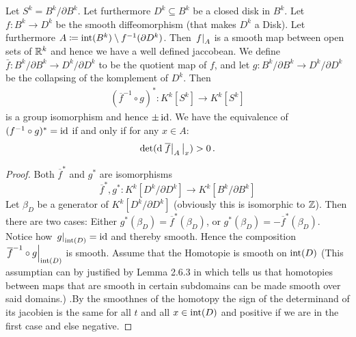 \begin{lemma} \label{lem: determined of javobean and collapsing map}
	Let $S^k=B^k\big/\partial B^k$. Let furthermore $D^k\subseteq B^k$ be a closed disk in $B^k$. Let $f: B^k\to D^k$ be the smooth diffeomorphism (that makes $D^k$ a Disk). Let furthermore $A\coloneq \operatorname{\mathrm{int}}(B^k)\setminus f^{-1}(\partial D^k)$. Then $\left.f\right|_{A}$ is a smooth map between open sets of $\mathbb{R}^k$ and hence we have a well defined jaccobean. We define $\bar{f}:B^k\big/\partial B^k\to D^k\big/ \partial D^k$ to be the quotient map of $f$, and let $g:B^k\big/\partial B^k\to D^k\big/ \partial D^k$ be the collapsing of the komplement of $D^k$. Then 
	\begin{align*}
		(\overline{f}^{-1}\circ g)^*: K^k[S^k]\to K^k[S^k]
	\end{align*} is a group isomorphism and hence $\pm \operatorname{\mathrm{id}}$. We have the equivalence of $(f^{-1}\circ g)^*=\operatorname{\mathrm{id}}$ if and only if for any $x\in A$:
	\begin{equation*}
		\det(\mathop{}\!\mathrm{d} \left.\overline{f}\right|_{A}\big|_x)>0\, .
	\end{equation*}
\end{lemma}
\begin{proof} Both $\overline{f}^*$ and $g^*$ are isomorphisms
	\begin{equation*}
		\overline{f}^*,g^*:K^k[D^k\big/\partial D^k]\to K^k[B^k\big/\partial B^k]
	\end{equation*} Let $\beta_D$ be a generator of $K^k[D^k\big/\partial D^k]$ (obviously this is isomorphic to $\mathbb{Z}$). Then there are two cases: Either $g^*(\beta_D)=\overline{f}^*(\beta_D)$, or $g^*(\beta_D)=-\overline{f}^*(\beta_D)$. 
	Notice how $\left.g\right|_{\operatorname{\mathrm{int}}(D)}=\operatorname{\mathrm{id}}$ and thereby smooth. Hence the composition $\left.\overline{f}^{-1}\circ g\right|_{\operatorname{\mathrm{int}}(D)}$ is smooth. Assume that the Homotopie is smooth on $\operatorname{\mathrm{int}}(D)$ (This assumptian can by justified by Lemma 2.6.3 in \cite{Mukherjee2015DifferentialTopology} which tells us that homotopies between maps that are smooth in certain subdomains can be made smooth over said domains.)
	.By the smoothnes of the homotopy the sign of the determinand of its jacobien is the same for all $t$ and all $x\in \operatorname{\mathrm{int}}(D)$ and positive if we are in the first case and else negative.
	
	
	
	
	\end{proof}
 